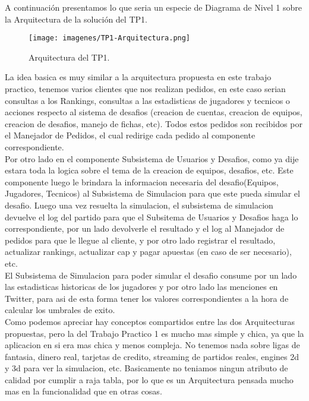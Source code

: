A continuación presentamos lo que seria un especie de Diagrama de Nivel 1 sobre la Arquitectura de la solución
del TP1.

\begin{figure}[H]
  \centering
  \texttt{[image: imagenes/TP1-Arquitectura.png]}
  \caption{Arquitectura del TP1.}
\end{figure}

La idea basica es muy similar a la arquitectura propuesta en este trabajo practico, tenemos varios clientes
que nos realizan pedidos, en este caso serian consultas a los Rankings, consultas a las estadisticas de jugadores
y tecnicos o acciones respecto al sistema de desafios (creacion de cuentas, creacion de equipos, creacion de desafios,
manejo de fichas, etc). Todos estos pedidos son recibidos por el Manejador de Pedidos, el cual redirige cada pedido
al componente correspondiente.\\
Por otro lado en el componente Subsistema de Usuarios y Desafios, como ya dije estara toda la logica sobre el tema de
la creacion de equipos, desafios, etc. Este componente luego le brindara la informacion necesaria del desafio(Equipos, Jugadores, Tecnicos) al Subsistema de Simulacion para que este pueda simular el desafio. Luego una vez resuelta la simulacion, el subsistema de simulacion devuelve el log del partido para que el Subsitema de Usuarios y Desafios haga lo correspondiente, por un lado devolverle el resultado y el log al Manejador de pedidos para que le llegue al cliente, y por otro lado registrar el resultado, actualizar rankings, actualizar cap y pagar apuestas (en caso de ser necesario), etc.\\
El Subsistema de Simulacion para poder simular el desafio consume por un lado las estadisticas historicas de los jugadores y por otro lado las menciones en Twitter, para asi de esta forma tener los valores correspondientes a la hora de calcular los umbrales de exito.\\

Como podemos apreciar hay conceptos compartidos entre las dos Arquitecturas propuestas, pero la del Trabajo Practico 1 es mucho mas simple y chica, ya que la aplicacion en si era mas chica y menos compleja. No tenemos nada sobre ligas de fantasia, dinero real, tarjetas de credito, streaming de partidos reales, engines 2d y 3d para ver la simulacion, etc. Basicamente no teniamos ningun atributo de calidad por cumplir a raja tabla, por lo que es un Arquitectura pensada mucho mas en la funcionalidad que en otras cosas.
